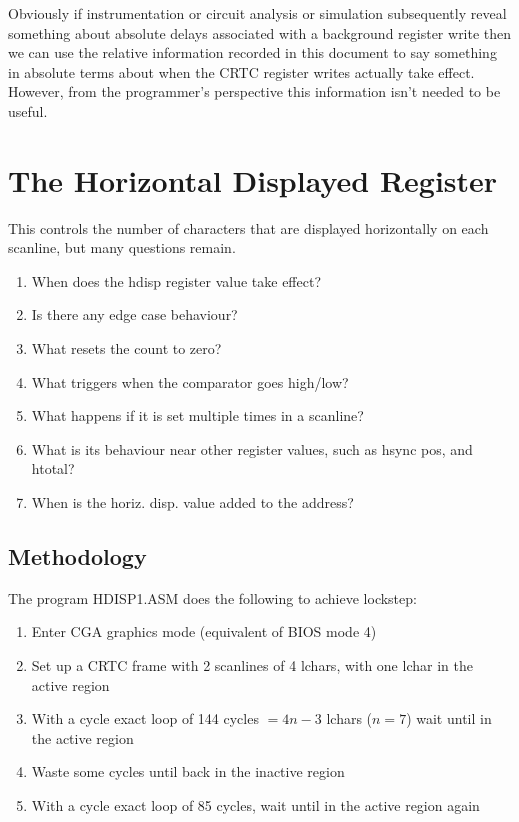 \documentclass[a4paper,10pt]{amsart}
\begin{document}
Obviously if instrumentation or circuit analysis or simulation subsequently
reveal something about absolute delays associated with a background register
write then we can use the relative information recorded in this document to
say something in absolute terms about when the CRTC register writes actually
take effect. However, from the programmer's perspective this information isn't
needed to be useful.

\section{The Horizontal Displayed Register}

This controls the number of characters that are displayed horizontally on each
scanline, but many questions remain.

\begin{enumerate}
\item When does the hdisp register value take effect?
\item Is there any edge case behaviour?
\item What resets the count to zero?
\item What triggers when the comparator goes high/low?
\item What happens if it is set multiple times in a scanline?
\item What is its behaviour near other register values, such as hsync pos,
      and htotal?
\item When is the horiz. disp. value added to the address?
\end{enumerate}

\subsection{Methodology}

The program HDISP1.ASM does the following to achieve lockstep:

\begin{enumerate}
\item Enter CGA graphics mode (equivalent of BIOS mode 4)
\item Set up a CRTC frame with 2 scanlines of 4 lchars, with one lchar in the active region
\item With a cycle exact loop of 144 cycles $= 4n-3$ lchars ($n = 7$) wait until in the active region
\item Waste some cycles until back in the inactive region
\item With a cycle exact loop of 85 cycles, wait until in the active region again
\end{enumerate}
\end{document}
